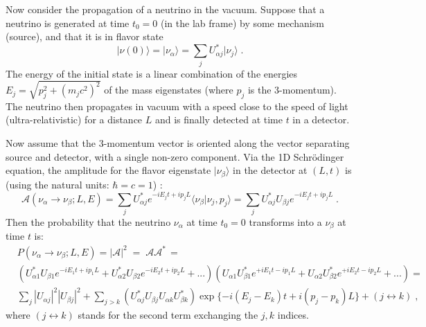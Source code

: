 Now consider the propagation of a neutrino in the vacuum. Suppose that a neutrino is generated at time $t_0=0$ (in the lab frame) by some mechanism (source), and that it is in flavor state
\begin{equation}
|\nu(0) \rangle = |\nu_\alpha \rangle = \sum_j U^*_{\alpha j}|\nu_j \rangle \;.
\end{equation}
The energy of the initial state is a linear combination of the energies $E_j=\sqrt{p_j^2 + (m_j c^2)^2}$ of the mass eigenstates (where $p_j$ is the 3-momentum). The neutrino then propagates in vacuum with a speed close to the speed of light (ultra-relativistic) for a distance $L$ and is finally detected at time $t$ in a detector.

Now assume that the 3-momentum vector is oriented along the vector separating source and detector, with a single non-zero component. Via the 1D Schr\"{o}dinger equation, the amplitude for the flavor eigenstate $|\nu_\beta\rangle$ in the detector at $(L,t)$ is (using the natural units: $\hbar=c=1$) \cite{aitchison2012gauge}:
\begin{equation}
\mathcal{A}(\nu_\alpha\to\nu_\beta;L,E)=\sum_{j}U^*_{\alpha j}e^{-i E_j t+i p_j L}\langle\nu_\beta|\nu_j,p_j\rangle=\sum_{j}U^*_{\alpha j}U_{\beta j}e^{-iE_jt+ip_jL} \; .
\end{equation}
Then the probability that the neutrino $\nu_\alpha$ at time $t_0=0$ transforms into a $\nu_\beta$ at time $t$ is:
\begin{equation}\label{oscillationEq1}
 \begin{split}
&P(\nu_\alpha\to\nu_\beta;L,E)= |\mathcal{A}|^2 \; = \; \mathcal{A} \mathcal{A}^* \, =  \\%
&(U^*_{\alpha 1}U_{\beta 1}e^{-iE_1t+ip_1L}+U^*_{\alpha 2}U_{\beta 2}e^{-iE_2t+ip_2L}+...)(U_{\alpha 1}U^*_{\beta 1}e^{+iE_1t-ip_1L}+U_{\alpha 2}U^*_{\beta 2}e^{+iE_2t-ip_2L}+...)=\\
&\sum_j |U_{\alpha j}|^2|U_{\beta j}|^2 + \sum_{j>k}(U^*_{\alpha j}U_{\beta j}U_{\alpha k}U^*_{\beta k})\exp\{-i(E_j-E_k)t+i(p_j-p_k)L\}+(j\leftrightarrow k)\;,
\end{split}
\end{equation}
where $(j\leftrightarrow k)$ stands for the second term exchanging the $j,k$ indices.

